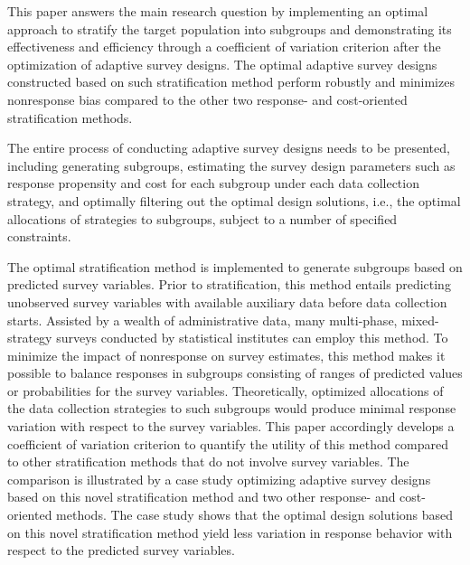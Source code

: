 \documentclass[12pt]{article}
\begin{document}
This paper answers the main research question by implementing an optimal approach to stratify the target population into subgroups and demonstrating its effectiveness and efficiency through a coefficient of variation criterion after the optimization of adaptive survey designs.
The optimal adaptive survey designs constructed based on such stratification method perform robustly and minimizes nonresponse bias compared to the other two response- and cost-oriented stratification methods.

The entire process of conducting adaptive survey designs needs to be presented, including generating subgroups, estimating the survey design parameters such as response propensity and cost for each subgroup under each data collection strategy, and optimally filtering out the optimal design solutions, i.e., the optimal allocations of strategies to subgroups, subject to a number of specified constraints.

The optimal stratification method is implemented to generate subgroups based on predicted survey variables.
Prior to stratification, this method entails predicting unobserved survey variables with available auxiliary data before data collection starts.
Assisted by a wealth of administrative data, many multi-phase, mixed-strategy surveys conducted by statistical institutes can employ this method.
To minimize the impact of nonresponse on survey estimates, this method makes it possible to balance responses in subgroups consisting of ranges of predicted values or probabilities for the survey variables.
Theoretically, optimized allocations of the data collection strategies to such subgroups would produce minimal response variation with respect to the survey variables.
This paper accordingly develops a coefficient of variation criterion to quantify the utility of this method compared to other stratification methods that do not involve survey variables.
The comparison is illustrated by a case study optimizing adaptive survey designs based on this novel stratification method and two other response- and cost-oriented methods.
The case study shows that the optimal design solutions based on this novel stratification method yield less variation in response behavior with respect to the predicted survey variables.
\end{document}
